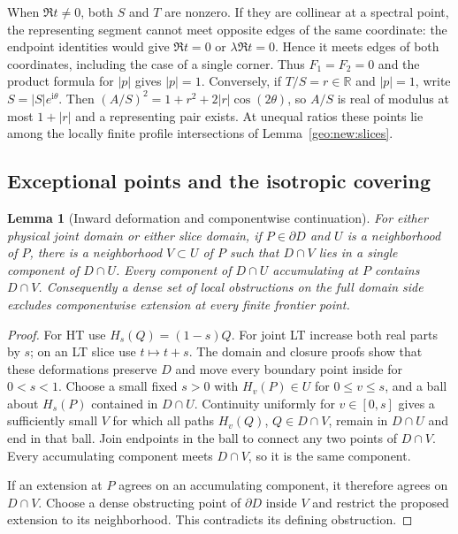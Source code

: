 \documentclass[11pt]{article}
\numberwithin{equation}{section}
\newtheorem{lemma}[theorem]{Lemma}
\theoremstyle{definition}
\newcommand{\R}{\mathbb R}
\newcommand{\ii}{\mathrm i}
\begin{document}
When $\Re t\ne0$, both $S$ and $T$ are nonzero. If they are collinear
at a spectral point, the representing segment cannot meet opposite
edges of the same coordinate: the endpoint identities would give
$\Re t=0$ or $\lambda\Re t=0$. Hence it meets edges of both
coordinates, including the case of a single corner. Thus $F_1=F_2=0$
and the product formula for $|p|$ gives $|p|=1$. Conversely, if
$T/S=r\in\R$ and $|p|=1$, write $S=|S|e^{\ii\theta}$. Then
$(A/S)^2=1+r^2+2|r|\cos(2\theta)$, so $A/S$ is real of modulus
at most $1+|r|$ and a representing pair exists. At unequal ratios
these points lie among the locally finite profile intersections of
Lemma~\ref{geo:new:slices}.

\subsection{Exceptional points and the isotropic covering}

\begin{lemma}[Inward deformation and componentwise continuation]
\label{geo:new:collar}
For either physical joint domain or either slice domain, if
$P\in\partial D$ and $U$ is a neighborhood of $P$, there is
a neighborhood $V\subset U$ of $P$ such that $D\cap V$ lies
in a single component of $D\cap U$.  Every component of
$D\cap U$ accumulating at $P$ contains $D\cap V$.
Consequently a dense set of local obstructions on the full domain side
excludes componentwise extension at every finite frontier point.
\end{lemma}
\begin{proof}
For HT use $H_s(Q)=(1-s)Q$.  For joint LT increase both real
parts by $s$; on an LT slice use $t\mapsto t+s$.
The domain and closure proofs show that these deformations
preserve $D$ and move every boundary point inside for $0<s<1$.
Choose a small fixed $s>0$ with $H_v(P)\in U$ for $0\leq v\leq s$,
and a ball about $H_s(P)$ contained in $D\cap U$.
Continuity uniformly for $v\in[0,s]$ gives a sufficiently small
$V$ for which all paths $H_v(Q)$, $Q\in D\cap V$, remain
in $D\cap U$ and end in that ball.  Join endpoints in the
ball to connect any two points of $D\cap V$. Every accumulating
component meets $D\cap V$, so it is the same component.

If an extension at $P$ agrees on an accumulating component,
it therefore agrees on $D\cap V$.  Choose a dense obstructing
point of $\partial D$ inside $V$ and restrict the proposed
extension to its neighborhood.  This contradicts its defining
obstruction.
\end{proof}
\end{document}
